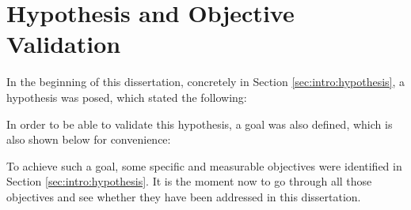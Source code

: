 \section{Hypothesis and Objective Validation}
\label{sec:conclusions:hypothesis}

In the beginning of this dissertation, concretely in Section \ref{sec:intro:hypothesis}, a hypothesis was posed, which stated the following:

\vspace{0.5cm}

\noindent{}

\vspace{0.5cm}

In order to be able to validate this hypothesis, a goal was also defined, which is also shown below for convenience:

\vspace{0.5cm}

\noindent{}

\vspace{0.5cm}

To achieve such a goal, some specific and measurable objectives were identified in Section \ref{sec:intro:hypothesis}. It is the moment now to go through all those objectives and see whether they have been addressed in this dissertation. 

